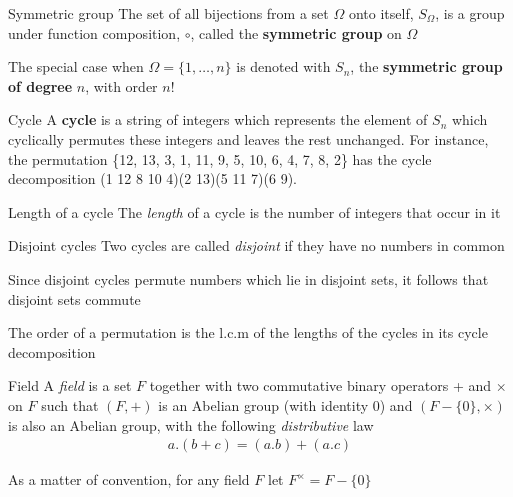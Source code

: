 \documentclass[titlepage, 12pt]{article}
\begin{document}
\begin{definition}{Symmetric group}{}
  The set of all bijections from a set $\Omega$ onto itself, $S_\Omega$,
    is a group under function composition, $\circ$, called the \textbf{symmetric
    group} on $\Omega$

  The special case when $\Omega = \{1,\dots,n\}$ is denoted with $S_n$,
    the \textbf{symmetric group of degree} $n$, with order $n$!
\end{definition}

\begin{definition}{Cycle}{}
  A \textbf{cycle} is a string of integers which represents the element of
    $S_n$ which cyclically permutes these integers and leaves the rest
    unchanged. For instance, the permutation \{12, 13, 3, 1, 11, 9, 5, 10, 6, 4,
    7, 8, 2\} has the cycle decomposition (1 12 8 10 4)(2 13)(5 11 7)(6 9).
\end{definition}

\begin{definition}{Length of a cycle}{}
  The \textit{length} of a cycle is the number of integers that occur in
    it
\end{definition}

\begin{definition}{Disjoint cycles}{}
  Two cycles are called \textit{disjoint} if they have no numbers in
    common
\end{definition}

\begin{proposition}{}{}
Since disjoint cycles permute numbers which lie in disjoint sets, it
follows that disjoint sets commute
\end{proposition}

\begin{proposition}{}{}
The order of a permutation is the l.c.m of the lengths of the cycles in
its cycle decomposition
\end{proposition}


\begin{definition}{Field}{}
    A \textit{field} is a set $F$ together with two commutative binary
    operators + and $\times$ on $F$ such that $(F, +)$ is an Abelian group (with
    identity 0) and $(F-\{0\}, \times)$ is also an Abelian group, with the following
    \textit{distributive} law
    \begin{gather*}
        a.(b+c) = (a.b)+(a.c)
    \end{gather*}
\end{definition}
As a matter of convention, for any field $F$ let $F^\times = F-\{0\}$
\end{document}
